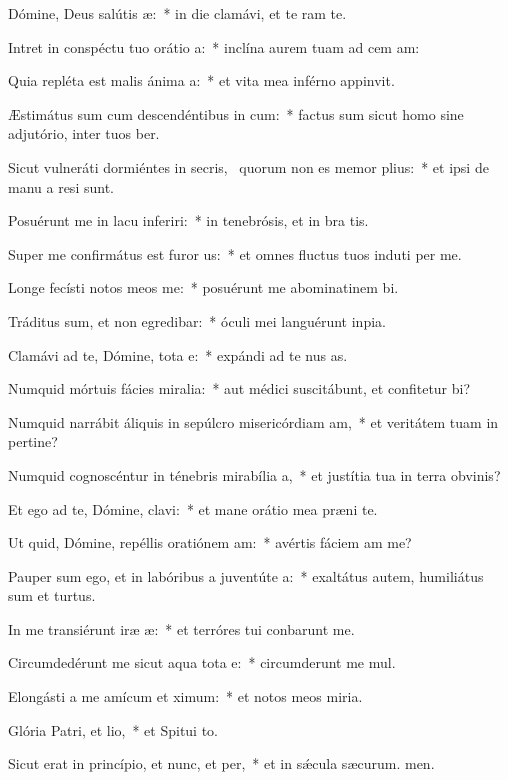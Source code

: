\item Dómine, Deus salútis æ:~* in die clamávi, et te ram te.
\item Intret in conspéctu tuo orátio a:~* inclína aurem tuam ad cem am:
\item Quia repléta est malis ánima a:~* et vita mea inférno appinvit.
\item Æstimátus sum cum descendéntibus in cum:~* factus sum sicut homo sine adjutório, inter tuos ber.
\item Sicut vulneráti dormiéntes in secris,~\pscross{} quorum non es memor plius:~* et ipsi de manu a resi sunt.
\item Posuérunt me in lacu inferiri:~* in tenebrósis, et in bra tis.
\item Super me confirmátus est furor us:~* et omnes fluctus tuos induti per me.
\item Longe fecísti notos meos  me:~* posuérunt me abominatinem bi.
\item Tráditus sum, et non egredibar:~* óculi mei languérunt  inpia.
\item Clamávi ad te, Dómine, tota e:~* expándi ad te nus as.
\item Numquid mórtuis fácies miralia:~* aut médici suscitábunt, et confitetur bi?
\item Numquid narrábit áliquis in sepúlcro misericórdiam am,~* et veritátem tuam in pertine?
\item Numquid cognoscéntur in ténebris mirabília a,~* et justítia tua in terra obvinis?
\item Et ego ad te, Dómine, clavi:~* et mane orátio mea præni te.
\item Ut quid, Dómine, repéllis oratiónem am:~* avértis fáciem am  me?
\item Pauper sum ego, et in labóribus a juventúte a:~* exaltátus autem, humiliátus sum et turtus.
\item In me transiérunt iræ æ:~* et terróres tui conbarunt me.
\item Circumdedérunt me sicut aqua tota e:~* circumderunt me mul.
\item Elongásti a me amícum et ximum:~* et notos meos  miria.
\item Glória Patri, et lio,~* et Spitui to.
\item Sicut erat in princípio, et nunc, et per,~* et in sǽcula sæcurum. men.

